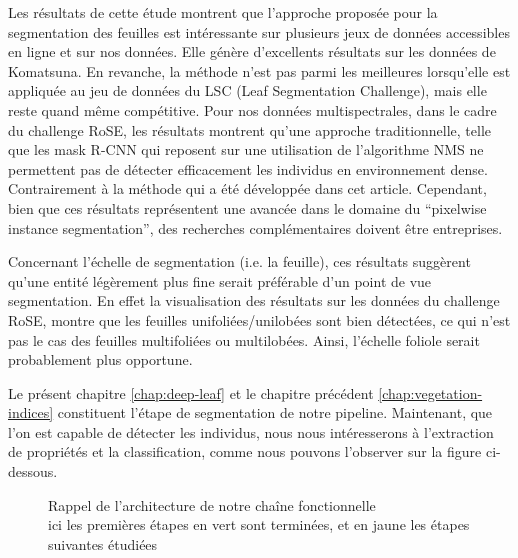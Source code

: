 \documentclass[../thesis.tex]{subfiles}
\begin{document}
	Les résultats de cette étude montrent que l'approche proposée pour la segmentation des feuilles est intéressante sur plusieurs jeux de données accessibles en ligne et sur nos données. Elle génère d'excellents résultats sur les données de Komatsuna. En revanche, la méthode n'est pas parmi les meilleures lorsqu'elle est appliquée au jeu de données du LSC (Leaf Segmentation Challenge), mais elle reste quand même compétitive. Pour nos données multispectrales, dans le cadre du challenge RoSE, les résultats montrent qu'une approche traditionnelle, telle que les mask R-CNN qui reposent sur une utilisation de l'algorithme NMS ne permettent pas de détecter efficacement les individus en environnement dense. Contrairement à la méthode qui a été développée dans cet article. Cependant, bien que ces résultats représentent une avancée dans le domaine du ``pixelwise instance segmentation'', des recherches complémentaires doivent être entreprises.
    
    Concernant l'échelle de segmentation (i.e. la feuille), ces résultats suggèrent qu'une entité légèrement plus fine serait préférable d'un point de vue segmentation. En effet la visualisation des résultats sur les données du challenge RoSE, montre que les feuilles unifoliées/unilobées sont bien détectées, ce qui n'est pas le cas des feuilles multifoliées ou multilobées. Ainsi, l'échelle foliole serait probablement plus opportune.
    
    Le présent chapitre \ref{chap:deep-leaf} et le chapitre précédent \ref{chap:vegetation-indices} constituent l'étape de segmentation de notre pipeline. Maintenant, que l'on est capable de détecter les individus, nous nous intéresserons à l'extraction de propriétés et la classification, comme nous pouvons l'observer sur la figure ci-dessous.
	
	\begin{figure}[H]
		
		\centering
		
        {Rappel de l'architecture de notre chaîne fonctionnelle \\ ici les premières étapes en vert sont terminées, et en jaune les étapes suivantes étudiées}
	\end{figure}
	
\end{document}
